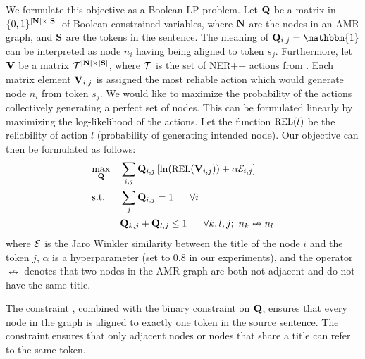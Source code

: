 We formulate this objective as a Boolean LP problem.
Let $\mathbf{Q}$ be a matrix in $\{0,1\}^{|\mathbf{N}| \times |\mathbf{S}|}$ of Boolean constrained variables,
  where $\mathbf{N}$ are the 
  nodes in an AMR graph, and $\mathbf{S}$ are the tokens in the sentence.
The meaning of $\bQ_{i,j} = \mathbbm{1}$ can be interpreted as node 
  $n_i$ having being aligned to token $s_j$.
Furthermore, let $\mathbf{V}$ be a matrix $\mathcal{T}^{|\mathbf{N}| \times |\mathbf{S}|}$, where
  $\mathcal{T}$ is the set of NER++ actions from .
Each matrix element $\mathbf{V}_{i,j}$ is assigned the most reliable action which would
  generate node $n_i$ from token $s_j$.
We would like to maximize the probability of the actions collectively generating a perfect set of nodes.
This can be formulated linearly by maximizing the log-likelihood of the actions.
Let the function $\textrm{\small{REL}}(l)$ be the reliability of action $l$ (probability of generating intended node).
Our objective can then be formulated as follows:
\begin{align}
  \label{eqn:objective}
  & \underset{\bQ}{\textrm{max}}
     & & \sum_{i,j} \bQ_{i,j} \left[ 
         \ln(\textrm{\small{REL}}(\bV_{i,j}))
         + \alpha \sE_{i,j} \right] \\
  \label{eqn:constraint1}
  & \textrm{s.t.}
     & & \sum_{j} \bQ_{i,j} = 1 ~~~~~ \forall i \\
  \label{eqn:constraint2}
  & & & \bQ_{k,j} + \bQ_{l,j} \leq 1 ~~~~~ \forall k,l,j; ~ n_k \nleftrightarrow n_l
\end{align}
where $\mathcal{E}$ is the Jaro Winkler similarity between the title of the node $i$ and the
  token $j$, $\alpha$ is a hyperparameter (set to 0.8 in our experiments),
  and the operator $\nleftrightarrow$ denotes that two nodes in the AMR graph are
  both not adjacent and do not have the same title.

The constraint , combined with the binary constraint on $\mathbf{Q}$, ensures that every node in the graph is
  aligned to exactly one token in the source sentence.
The constraint  ensures that only adjacent nodes or nodes that share a title can refer to the same token.

